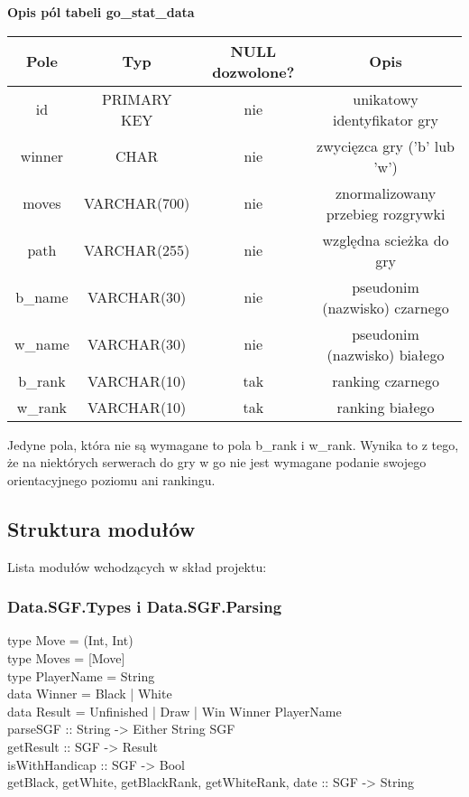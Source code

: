 \documentclass[10pt,leqno]{article}
\begin{document}
\begin{center}
\textbf{Opis pól tabeli go\_stat\_data}
\renewcommand{\arraystretch}{1.5}
\begin{tabular}{| c | c | c | c | } \hline
 Pole    & Typ          & NULL dozwolone? & Opis                  \\ \hline
 id      & PRIMARY KEY  & nie & unikatowy identyfikator gry       \\ \hline
 winner  & CHAR         & nie & zwycięzca gry ('b' lub 'w')       \\ \hline
 moves   & VARCHAR(700) & nie & znormalizowany przebieg rozgrywki \\ \hline
 path    & VARCHAR(255) & nie & względna scieżka do gry           \\ \hline
 b\_name & VARCHAR(30)  & nie & pseudonim (nazwisko) czarnego     \\ \hline
 w\_name & VARCHAR(30)  & nie & pseudonim (nazwisko) białego      \\ \hline
 b\_rank & VARCHAR(10)  & tak & ranking czarnego                  \\ \hline
 w\_rank & VARCHAR(10)  & tak & ranking białego                   \\ \hline
\end{tabular}

\end{center}

Jedyne pola, która nie są wymagane to pola b\_rank i w\_rank. Wynika to z tego, że na niektórych serwerach do gry w go
nie jest wymagane podanie swojego orientacyjnego poziomu ani rankingu. 

\subsection{Struktura modułów}
Lista modułów wchodzących w skład projektu:

\subsubsection{Data.SGF.Types i Data.SGF.Parsing}

\begin{framed}
\noindent type Move  = (Int, Int) \\
type Moves = [Move] \\
type PlayerName = String \\ 
data Winner     = Black | White \\
data Result = Unfinished | Draw | Win Winner PlayerName \\

\noindent parseSGF :: String -> Either String SGF \\
getResult :: SGF -> Result \\
isWithHandicap :: SGF -> Bool \\
getBlack, getWhite, getBlackRank, getWhiteRank, date :: SGF -> String
\end{framed}
\end{document}
